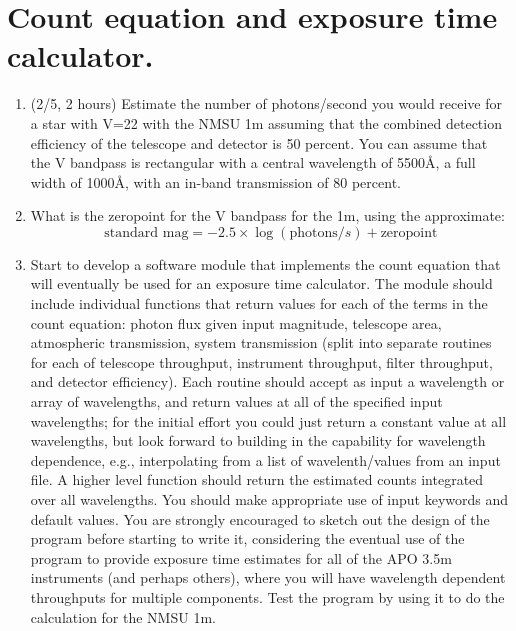 \documentclass[12pt]{article}
\begin{document}
\section*{\normalsize{Count equation and exposure time calculator.}}

\begin{enumerate}[1.]
    \item (2/5, 2 hours) Estimate the number of photons/second
you would receive for a star with V=22 with the NMSU 1m assuming that
the combined detection efficiency of the telescope and detector is 50
percent. You can assume that the V bandpass is rectangular with a
central wavelength of 5500\AA{}, a full width of 1000\AA{}, with an
in-band transmission of 80 percent.
    \item What is the zeropoint for the V bandpass for the 1m,
        using the approximate:
        $$ \textrm{standard\ mag} = - 2.5\times\log(\textrm{photons}/s)
        + {\textrm{zeropoint}} $$
    \item Start to develop a software module that implements the count
        equation that will eventually be used for an exposure time calculator.
        The module should include individual functions that return values for
        each of the terms in the count equation: photon flux given input magnitude,
        telescope area, atmospheric transmission, system transmission
        (split into separate routines for each of telescope throughput,
        instrument throughput, filter throughput, and detector efficiency).
        Each routine should accept as input a wavelength or array of wavelengths,
        and return values at all of the specified input wavelengths;
        for the initial effort you could just return a constant value
        at all wavelengths, but look forward to building in the capability
        for wavelength dependence, e.g., interpolating from a list of
        wavelenth/values from an input file. A higher level function should
        return the estimated counts integrated over all wavelengths.
        You should make appropriate use of input keywords and default values.
        You are strongly encouraged to sketch out the design of the program
        before starting to write it, considering the eventual use of the
        program to provide exposure time estimates for all of the APO 3.5m
        instruments (and perhaps others), where you will have wavelength
        dependent throughputs for multiple components.
        Test the program by using it to do the calculation for the NMSU 1m.
\end{enumerate}
\end{document}
